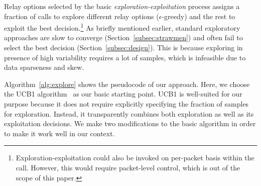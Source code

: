 Relay options selected by the basic {\em exploration-exploitation} process assigns a fraction of calls  to explore different relay options ($\epsilon$-greedy) and the rest to exploit the best decision.\footnote{Exploration-exploitation could also be invoked on per-packet basis within the call. However, this would require packet-level control, which is out of the scope of this paper.}
As briefly mentioned earlier, standard exploratory approaches  are slow to converge (Section~\ref{subsec:strawmen}) and often fail to select the best decision (Section~\ref{subsec:design}). This is because exploring in presence of high variability requires a lot of samples, which is infeasible due to data sparseness and skew. %

Algorithm~\ref{alg:explore} shows the pseudocode of our approach.
 Here, we choose  the UCB1 algorithm~\cite{ucb1} as our 
 basic starting point. UCB1 is well-suited for our purpose because  
 it does not require explicitly specifying the fraction of samples for exploration. Instead, it transparently combines both exploration as well as its exploitation decisions. %
 We make two modifications to the basic algorithm
 in order to make it work well in our context.


